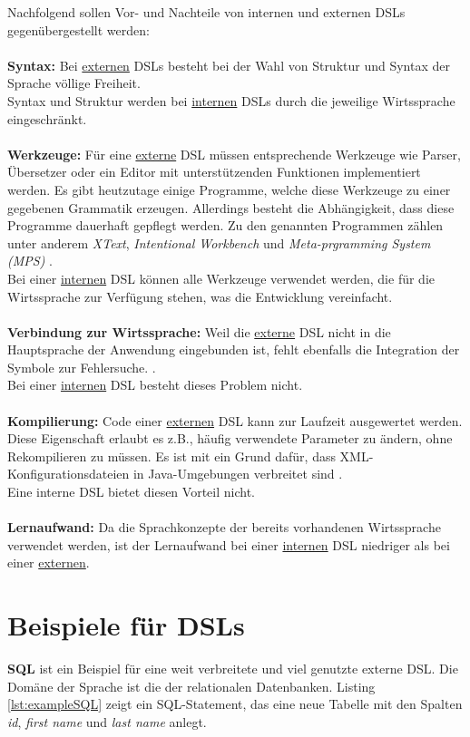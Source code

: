 Nachfolgend sollen Vor- und Nachteile von internen und externen DSLs gegenübergestellt werden:
\\ \\
\textbf{Syntax:}
Bei \underline{externen} DSLs besteht bei der Wahl von Struktur und Syntax der Sprache völlige Freiheit.\\
Syntax und Struktur werden bei \underline{internen} DSLs durch die jeweilige Wirtssprache eingeschränkt.
\\ \\
\textbf{Werkzeuge:}
Für eine \underline{externe} DSL müssen entsprechende Werkzeuge wie Parser, Übersetzer oder ein Editor mit unterstützenden Funktionen implementiert 
werden. Es gibt heutzutage einige Programme, welche diese Werkzeuge zu einer gegebenen Grammatik erzeugen. Allerdings besteht die Abhängigkeit, dass 
diese Programme dauerhaft gepflegt werden. Zu den genannten Programmen zählen unter anderem \emph{XText}\cite{www:xtext}, \emph{Intentional 
Workbench} \cite{www:intentsoft} und \emph{Meta-prgramming System (MPS)} \cite{www:mps}.\\
Bei einer \underline{internen} DSL können alle Werkzeuge verwendet werden, die für die Wirtssprache zur Verfügung stehen, was die Entwicklung vereinfacht.
\\ \\
\textbf{Verbindung zur Wirtssprache:}
Weil die \underline{externe} DSL nicht in die Hauptsprache der Anwendung eingebunden ist, fehlt ebenfalls die Integration der Symbole zur Fehlersuche. \cite{www:fowlerWorkbench}.\\
Bei einer \underline{internen} DSL besteht dieses Problem nicht.
\\ \\
\textbf{Kompilierung:}
Code einer \underline{externen} DSL kann zur Laufzeit ausgewertet werden. Diese Eigenschaft erlaubt es z.B., häufig verwendete Parameter zu ändern, ohne 
Rekompilieren zu müssen. Es ist mit ein Grund dafür, dass XML-Konfigurationsdateien in Java-Umgebungen verbreitet sind \cite{www:fowlerWorkbench}.\\
Eine interne DSL bietet diesen Vorteil nicht.
\\ \\
\textbf{Lernaufwand:}
Da die Sprachkonzepte der bereits vorhandenen Wirtssprache verwendet werden, ist der Lernaufwand bei einer \underline{internen} DSL niedriger als bei einer \underline{externen}.

\section{Beispiele für DSLs}\label{sct:2.3:beispiele}
\textbf{SQL} ist ein Beispiel für eine weit verbreitete und viel genutzte externe DSL. Die Domäne der Sprache ist die der relationalen Datenbanken. Listing \ref{lst:exampleSQL} zeigt ein SQL-Statement, das eine neue Tabelle mit den Spalten \emph{id}, \emph{first name} und \emph{last name} anlegt.\\

